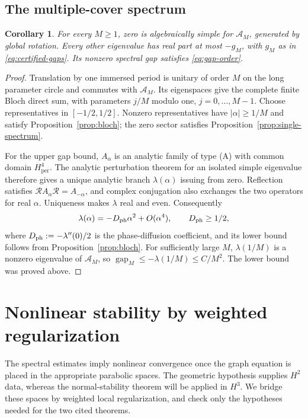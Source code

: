 \documentclass[a4paper,11pt]{article}
\numberwithin{equation}{section}
\newtheorem{corollary}[theorem]{Corollary}
\theoremstyle{definition}
\theoremstyle{remark}
\newcommand{\per}{\mathrm{per}}
\newcommand{\calR}{\mathcal R}
\newcommand{\gap}{\operatorname{gap}}
\begin{document}
\subsection{The multiple-cover spectrum}
\begin{corollary}\label{cor:multicover}
For every $M\ge1$, zero is algebraically simple for $\mathcal A_M$, generated by global rotation. Every other eigenvalue has real part at most $-g_M$, with $g_M$ as in \eqref{eq:certified-gaps}. Its nonzero spectral gap satisfies \eqref{eq:gap-order}.
\end{corollary}
\begin{proof}
Translation by one immersed period is unitary of order $M$ on the long parameter circle and commutes with $\mathcal A_M$. Its eigenspaces give the complete finite Bloch direct sum, with parameters $j/M$ modulo one, $j=0,\ldots,M-1$. Choose representatives in $[-1/2,1/2]$. Nonzero representatives have $|\alpha|\ge1/M$ and satisfy Proposition~\ref{prop:bloch}; the zero sector satisfies Proposition~\ref{prop:single-spectrum}. 

For the upper gap bound, $A_\alpha$ is an analytic family of type (A) with common domain $H^4_\per$. The analytic perturbation theorem for an isolated simple eigenvalue \cite[Chapter~VII, Section~1]{Kato} therefore gives a unique analytic branch $\lambda(\alpha)$ issuing from zero. Reflection satisfies $\calR A_\alpha\calR=A_{-\alpha}$, and complex conjugation also exchanges the two operators for real $\alpha$. Uniqueness makes $\lambda$ real and even. Consequently
\[
 \lambda(\alpha)=-D_{\rm ph}\alpha^2+O(\alpha^4),\qquad D_{\rm ph}\ge1/2,
\]
where $D_{\rm ph}:=-\lambda''(0)/2$ is the phase-diffusion coefficient, and its lower bound follows from Proposition~\ref{prop:bloch}. For sufficiently large $M$, $\lambda(1/M)$ is a nonzero eigenvalue of $\mathcal A_M$, so $\gap_M\le-\lambda(1/M)\le C/M^2$. The lower bound was proved above.
\end{proof}


\section{Nonlinear stability by weighted regularization}\label{sec:nonlinear}
The spectral estimates imply nonlinear convergence once the graph equation is placed in the appropriate parabolic spaces. The geometric hypothesis supplies $H^2$ data, whereas the normal-stability theorem will be applied in $H^3$. We bridge these spaces by weighted local regularization, and check only the hypotheses needed for the two cited theorems.
\end{document}
